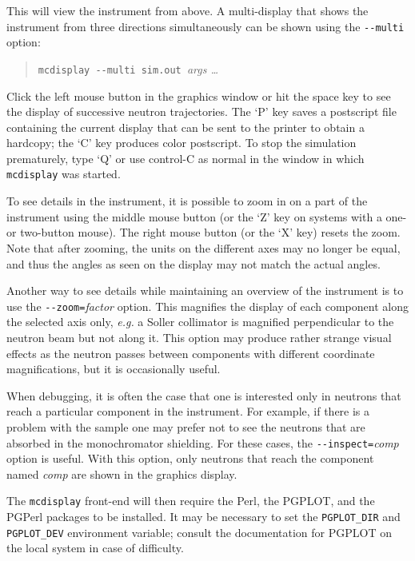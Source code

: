 This will view the instrument from above. A
multi-display that shows the instrument from three directions
simultaneously can be shown using the \verb+--multi+ option:
\begin{quote}
  \verb+mcdisplay --multi sim.out +{\it args \ldots}
\end{quote}

Click the left mouse button in the graphics window or hit the space key
to see the display of successive neutron trajectories. The `P' key saves
a postscript file containing the current display that can be sent to the
printer to obtain a hardcopy; the `C' key produces color postscript. 
To stop the simulation
prematurely, type `Q' or use control-C as normal in the window in which
\verb+mcdisplay+ was started.

To see details in the instrument, it is possible to zoom in on a part of
the instrument using the middle mouse button (or the `Z' key on systems
with a one- or two-button mouse). The right mouse button (or the `X'
key) resets the zoom. Note that after zooming, the units on the
different axes may no longer be equal, and thus the angles as seen on
the display may not match the actual angles.

Another way to see details while maintaining an overview of the
instrument is to use the \verb+--zoom=+\textit{factor} option. This
magnifies the display of each component along the selected axis only,
{\em e.g.} a Soller collimator is magnified perpendicular to the neutron beam
but not along it. This option may produce rather strange visual effects
as the neutron passes between components with different coordinate
magnifications, but it is occasionally useful.

When debugging, it is often the case that one is interested only in
neutrons that reach a particular component in the instrument. For
example, if there is a problem with the sample one may prefer not to see
the neutrons that are absorbed in the monochromator shielding. For these
cases, the \verb+--inspect=+\textit{comp\/} option is useful. With this
option, only neutrons that reach the component named \textit{comp\/} are
shown in the graphics display.

The \verb+mcdisplay+ front-end will then require the Perl, the PGPLOT, and the
PGPerl packages to be installed. It may be necessary to set the
\verb+PGPLOT_DIR+ and \verb+PGPLOT_DEV+ environment variable; consult the
documentation for PGPLOT on the local system in case of difficulty.
  

